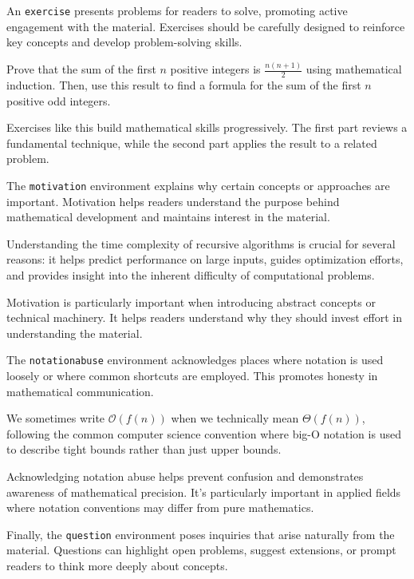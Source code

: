 \documentclass[9pt]{amsart}
\begin{document}
An \texttt{exercise} presents problems for readers to solve, promoting active
engagement with the material. Exercises should be carefully designed to
reinforce key concepts and develop problem-solving skills.

\begin{exercise}
	Prove that the sum of the first $n$ positive integers is $\frac{n(n+1)}{2}$ using mathematical induction. Then, use this result to find a formula for the sum of the first $n$ positive odd integers.
\end{exercise}

Exercises like this build mathematical skills progressively. The first part
reviews a fundamental technique, while the second part applies the result to a
related problem.

The \texttt{motivation} environment explains why certain concepts or approaches
are important. Motivation helps readers understand the purpose behind
mathematical development and maintains interest in the material.

\begin{motivation}
	Understanding the time complexity of recursive algorithms is crucial for several reasons: it helps predict performance on large inputs, guides optimization efforts, and provides insight into the inherent difficulty of computational problems.
\end{motivation}

Motivation is particularly important when introducing abstract concepts or
technical machinery. It helps readers understand why they should invest effort
in understanding the material.

The \texttt{notationabuse} environment acknowledges places where notation is
used loosely or where common shortcuts are employed. This promotes honesty in
mathematical communication.

\begin{notationabuse}
	We sometimes write $\mathcal{O}(f(n))$ when we technically mean $\Theta(f(n))$, following the common computer science convention where big-O notation is used to describe tight bounds rather than just upper bounds.
\end{notationabuse}

Acknowledging notation abuse helps prevent confusion and demonstrates awareness
of mathematical precision. It's particularly important in applied fields where
notation conventions may differ from pure mathematics.

Finally, the \texttt{question} environment poses inquiries that arise naturally
from the material. Questions can highlight open problems, suggest extensions,
or prompt readers to think more deeply about concepts.
\end{document}
